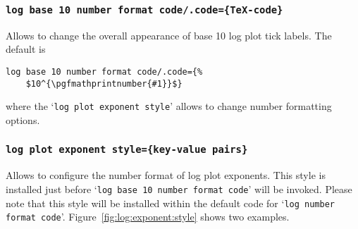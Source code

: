 \subsubsection{\texttt{log base 10 number format code/.code=\{\TeX-code\}}}
Allows to change the overall appearance of base 10 log plot tick labels. The default is
\begin{lstlisting}
log base 10 number format code/.code={%
	$10^{\pgfmathprintnumber{#1}}$}
\end{lstlisting}
where the `\texttt{log plot exponent style}' allows to change number formatting options.

\subsubsection{\texttt{log plot exponent style=\{key-value pairs\}}}
Allows to configure the number format of log plot exponents. This style is installed just before `\texttt{log base 10 number format code}' will be invoked. Please note that this style will be installed within the default code for `\texttt{log number format code}'. Figure~\ref{fig:log:exponent:style} shows two examples.
